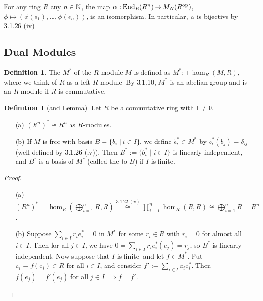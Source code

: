 \documentclass[11pt]{book}
\theoremstyle{definition}   \newtheorem{defn}[counter]{Definition} %
\DeclareMathOperator{\ra}{\rightarrow}   \DeclareMathOperator{\Poly}{\mathbf{P}}   \DeclareMathOperator{\spn}{\textnormal{span}}   \DeclareMathOperator{\aut}{\textnormal{Aut}}
\newcommand{\vs}{\vspace{8pt}}   \newcommand{\hs}{\hspace{8pt}}
\numberwithin{counter}{chapter}
\begin{document}
\begin{example}
For any ring $R$ any $n \in \operatorname{\mathbb{N}}$, the map $\alpha : \tn{End}_R(R^n) \ra M_N(R\op)$, $\phi \mapsto (\phi(e_1),\dots,\phi(e_n))$, is an isomorphism. In particular, $\alpha$ is bijective by 3.1.26 (iv).
\end{example}

\vs

\subsection*{Dual Modules}

\vs

\begin{defn}
The  $M^*$ of the $R$-module $M$ is defined as $M^* :+ \hom_R(M,R)$, where we think of $R$ as a left $R$-module. By 3.1.10, $M^*$ is an abelian group and is an $R$-module if $R$ is commutative.
\end{defn}

\vs

\begin{defn}[and Lemma]
Let $R$ be a commutative ring with $1 \ne 0$.
\begin{enumerate}
\item[(a)] $(R^n)^* \cong R^n$ as $R$-modules.
\item[(b)] If $M$ is free with basis $B = \{b_i \mid i \in I\}$, we define $b_i^* \in M^*$ by $b_i^*(b_j) = \delta_{ij}$ (well-defined by 3.1.26 (iv)). Then $B^* := \{b_i^* \mid i \in I\}$ is linearly independent, and $B^*$ is a basis of $M^*$ (called the  to $B$) if $I$ is finite.
\end{enumerate}
\end{defn}

\begin{proof}
\begin{enumerate}\
\item[(a)] $(R^n)^* = \hom_R\left(\bigoplus_{i=1}^n R, R\right) \overset{3.1.22 \ (v)}{\cong} \prod_{i=1}^n \hom_R(R,R) \cong \bigoplus_{i=1}^n R = R^n$.

\item[(b)] Suppose $\sum_{i \in I} r_i e_{i}^* = 0$ in $M^*$ for some $r_i \in R$ with $r_i = 0$ for almost all $i \in I$. Then for all $j \in I$, we have $0 = \sum_{i \in I} r_i e_i^*(e_j) = r_j$, so $B^*$ is linearly independent. Now suppose that $I$ is finite, and let $f \in M^*$. Put $a_i = f(e_i) \in R$ for all $i \in I$, and consider $f':= \sum_{i \in I} a_i e_i^*$. Then $f(e_j) = f'(e_j)$ for all $j \in I \implies f = f'$.
\end{enumerate}
\end{proof}
\end{document}

